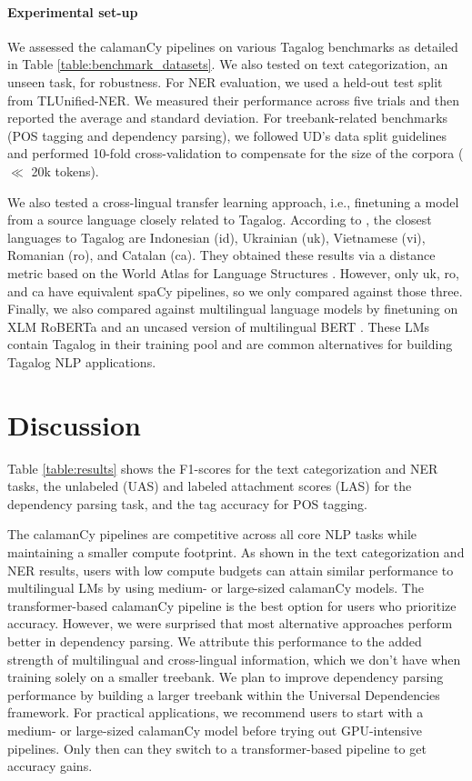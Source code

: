 \documentclass[11pt]{article}
\begin{document}
\paragraph*{Experimental set-up} 
We assessed the calamanCy pipelines on various Tagalog benchmarks as detailed in Table \ref{table:benchmark_datasets}.
We also tested on text categorization, an unseen task, for robustness.
For NER evaluation, we used a held-out test split from TLUnified-NER.
We measured their performance across five trials and then reported the average and standard deviation.
For treebank-related benchmarks (POS tagging and dependency parsing), we followed UD's data split guidelines \citep{Nivre2020UniversalDV} and performed 10-fold cross-validation to compensate for the size of the corpora ($\ll$ 20k tokens).

We also tested a cross-lingual transfer learning approach, i.e., finetuning a model from a source language closely related to Tagalog.
According to \citet{Aquino2020ParsingIT}, the closest languages to Tagalog are Indonesian (id), Ukrainian (uk), Vietnamese (vi), Romanian (ro), and Catalan (ca).
They obtained these results via a distance metric \citep{Agic2017CrossLingualPS} based on the World Atlas for Language Structures \citep{Haspelmath2005WALS}.
However, only uk, ro, and ca have equivalent spaCy pipelines, so we only compared against those three.
Finally, we also compared against multilingual language models
by finetuning on XLM RoBERTa \citep{Conneau2019UnsupervisedCR} and an uncased version of multilingual BERT \citep{Devlin2019BERTPO}.
These LMs contain Tagalog in their training pool and are common alternatives for building Tagalog NLP applications.

\section{Discussion}

Table \ref{table:results} shows the F1-scores for the text categorization and NER tasks, the unlabeled (UAS) and labeled attachment scores (LAS) for the dependency parsing task, and the tag accuracy for POS tagging.

The calamanCy pipelines are competitive across all core NLP tasks while maintaining a smaller compute footprint.
As shown in the text categorization and NER results, users with low compute budgets can attain similar performance to multilingual LMs by using medium- or large-sized calamanCy models.
The transformer-based calamanCy pipeline is the best option for users who prioritize accuracy.
However, we were surprised that most alternative approaches perform better in dependency parsing.
We attribute this performance to the added strength of multilingual and cross-lingual information, which we don't have when training solely on a smaller treebank.
We plan to improve dependency parsing performance by building a larger treebank within the Universal Dependencies framework.
For practical applications, we recommend users to start with a medium- or large-sized calamanCy model before trying out GPU-intensive pipelines. 
Only then can they switch to a transformer-based pipeline to get accuracy gains.
\end{document}
